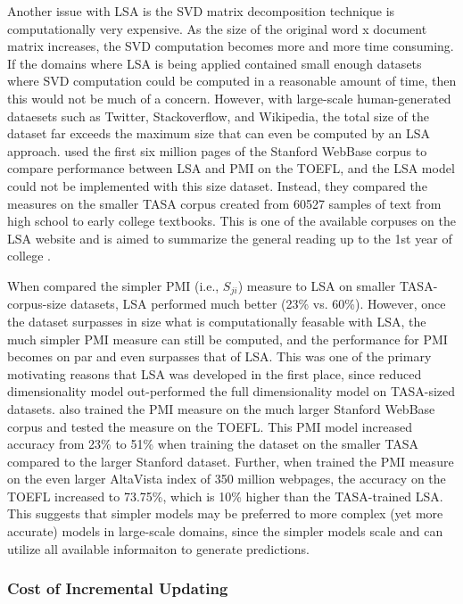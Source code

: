 \documentclass[man,floatsintext]{apa6}
\begin{document}
Another issue with LSA is the SVD matrix decomposition technique is computationally very expensive.
As the size of the original word x document matrix increases, the SVD computation becomes more and more time consuming.
If the domains where LSA is being applied contained small enough datasets where SVD computation could be computed in a reasonable amount of time, then this would not be much of a concern.
However, with large-scale human-generated dataesets such as Twitter, Stackoverflow, and Wikipedia, the total size of the dataset far exceeds the maximum size that can even be computed by an LSA approach.
\textcite{Budiu2007} used the first six million pages of the Stanford WebBase corpus to compare performance between LSA and PMI on the TOEFL, and the LSA model could not be implemented with this size dataset.
Instead, they compared the measures on the smaller TASA corpus created from \num{60527} samples of text from high school to early college textbooks.
This is one of the available corpuses on the LSA website and is aimed to summarize the general reading up to the 1st year of college \parencite{Budiu2007}.

When \textcite{Budiu2007} compared the simpler PMI (i.e., $S_{ji}$) measure to LSA on smaller TASA-corpus-size datasets, LSA performed much better (23\% vs. 60\%).
However, once the dataset surpasses in size what is computationally feasable with LSA, the much simpler PMI measure can still be computed, and the performance for PMI becomes on par and even surpasses that of LSA.
This was one of the primary motivating reasons that LSA was developed in the first place, since reduced dimensionality model out-performed the full dimensionality model on TASA-sized datasets.
\textcite{Budiu2007} also trained the PMI measure on the much larger Stanford WebBase corpus and tested the measure on the TOEFL.
This PMI model increased accuracy from 23\% to 51\% when training the dataset on the smaller TASA compared to the larger Stanford dataset.
Further, when \textcite{Turney2001} trained the PMI measure on the even larger AltaVista index of 350 million webpages, the accuracy on the TOEFL increased to 73.75\%, which is 10\% higher than the TASA-trained LSA.
This suggests that simpler models may be preferred to more complex (yet more accurate) models in large-scale domains, since the simpler models scale and can utilize all available informaiton to generate predictions.

\subsubsection{Cost of Incremental Updating}
\end{document}

